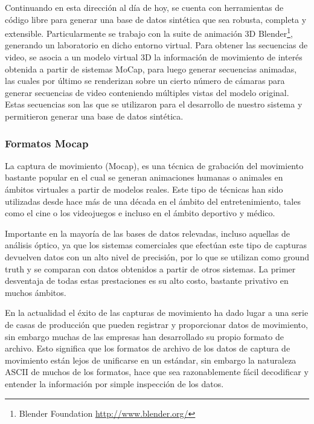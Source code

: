Continuando en esta dirección al día de hoy, se cuenta con herramientas de código libre para generar una base de datos sintética que sea robusta, completa y extensible. Particularmente se trabajo con la suite de animación 3D Blender\footnote{ Blender Foundation \textcolor{blue}{\underline{\url{http://www.blender.org/}}}}, generando un laboratorio en dicho entorno virtual. Para obtener las secuencias de video, se asocia a un modelo  virtual 3D la información de movimiento de interés obtenida a partir de sistemas MoCap, para luego generar secuencias animadas, las cuales por último se renderizan sobre un cierto número de cámaras para generar secuencias de video conteniendo múltiples vistas del modelo original. Estas secuencias son las que se utilizaron para el desarrollo de nuestro sistema y permitieron generar una base de datos sintética. 


\subsubsection{Formatos Mocap}
La captura de movimiento (Mocap), es una técnica de grabación del movimiento bastante popular en el cual se generan animaciones humanas o animales en ámbitos virtuales a partir de modelos reales. Este tipo de técnicas han sido utilizadas desde hace más de una década en el ámbito del entretenimiento, tales como el cine o los videojuegos e incluso en el ámbito deportivo y médico. 


Importante en la mayoría de las bases de datos relevadas, incluso aquellas de análisis óptico, ya que los sistemas comerciales que efectúan este tipo de capturas devuelven datos con un alto nivel de precisión, por lo que se utilizan como ground truth y se comparan con datos obtenidos a partir de otros sistemas. La primer desventaja de todas estas prestaciones es su alto costo, bastante privativo en muchos ámbitos.

En la actualidad el éxito de las capturas de movimiento ha dado lugar a una serie de casas de producción que pueden registrar y proporcionar datos de movimiento, sin embargo muchas de las empresas han desarrollado su propio formato de archivo. Esto significa que los formatos de archivo de los datos de captura de movimiento
están lejos de unificarse en un estándar, sin embargo la naturaleza ASCII de muchos de los formatos, hace que sea razonablemente fácil decodificar y entender la información por simple inspección de los datos.

